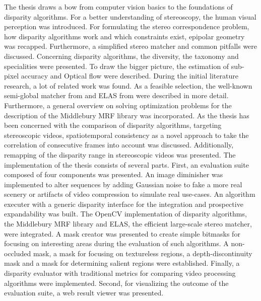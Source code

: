 The thesis draws a bow from computer vision basics to the foundations of disparity algorithms.
For a better understanding of stereoscopy, the human visual perception was introduced.
For formulating the stereo correspondence problem, how disparity algorithms work and which constraints exist, epipolar geometry was recapped.
Furthermore, a simplified stereo matcher and common pitfalls were discussed.
\newline\newline\noindent Concerning disparity algorithms, the diversity, the taxonomy and specialities were presented.
To draw the bigger picture, the estimation of sub-pixel accuracy and Optical flow were described.
During the initial literature research, a lot of related work was found.
As a feasible selection, the well-known semi-global matcher from \citeauthor{hirschmuller2005accurate} \citep{hirschmuller2005accurate} and ELAS from \citeauthor{Geiger2010ACCV} \citep{Geiger2010ACCV} were described in more detail.
Furthermore, a general overview on solving optimization problems for the description of the Middlebury MRF library was incorporated.
As the thesis has been concerned with the comparison of disparity algorithms, targeting stereoscopic videos, spatiotemporal consistency as a novel approach to take the correlation of consecutive frames into account was discussed.
Additionally, remapping of the disparity range in stereoscopic videos was presented.
\newline\newline\noindent The implementation of the thesis consists of several parts.
First, an evaluation suite composed of four components was presented.
An image diminisher was implemented to alter sequences by adding Gaussian noise to fake a more real scenery or artifacts of video compression to simulate real use-cases.
An algorithm executer with a generic disparity interface for the integration and prospective expandability was built.
The OpenCV implementation of disparity algorithms, the Middlebury MRF library and ELAS, the efficient large-scale stereo matcher, were integrated.
A mask creator was presented to create simple bitmasks for focusing on interesting areas during the evaluation of such algorithms.
A non-occluded mask, a mask for focusing on textureless regions, a depth-discontinuity mask and a mask for determining salient regions were established.
Finally, a disparity evaluator with traditional metrics for comparing video processing algorithms were implemented.
Second, for visualizing the outcome of the evaluation suite, a web result viewer was presented.
